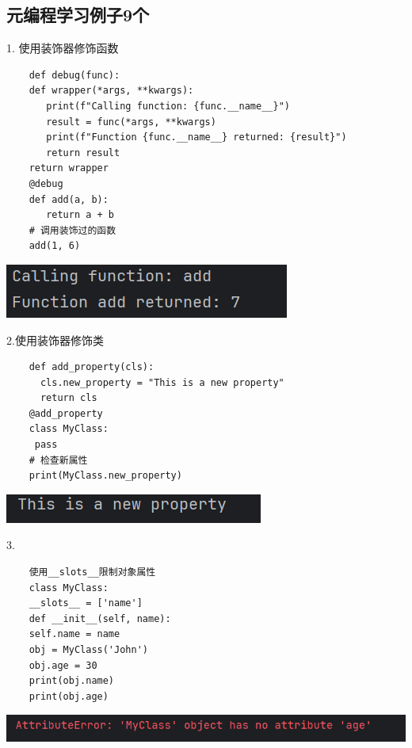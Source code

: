 \documentclass{article}
\begin{document}
\subsection{元编程学习例子9个}

1. 使用装饰器修饰函数
\begin{verbatim}
    def debug(func):
    def wrapper(*args, **kwargs):
       print(f"Calling function: {func.__name__}")
       result = func(*args, **kwargs)
       print(f"Function {func.__name__} returned: {result}")
       return result
    return wrapper
    @debug
    def add(a, b):
       return a + b
    # 调用装饰过的函数
    add(1, 6)
\end{verbatim}

\begin{minipage}{\linewidth}
    \centering
     \includegraphics[width=0.5\linewidth]{add.png}
     \label{fig:example}
\end{minipage}


2.使用装饰器修饰类
\begin{verbatim}
    def add_property(cls):
      cls.new_property = "This is a new property"
      return cls
    @add_property
    class MyClass:
     pass
    # 检查新属性
    print(MyClass.new_property)
\end{verbatim}


\noindent
\begin{minipage}{\linewidth}
 \centering
  \includegraphics[width=0.5\linewidth]{t2.png}
  \label{fig:example}
\end{minipage}

3.
\begin{verbatim}
	使用__slots__限制对象属性
	class MyClass:
	__slots__ = ['name']
	def __init__(self, name):
	self.name = name
	obj = MyClass('John')
	obj.age = 30  
	print(obj.name)
	print(obj.age)
\end{verbatim}

\noindent
\begin{minipage}{\linewidth}
	\centering
	\includegraphics[width=0.5\linewidth]{t3.png}
	\label{fig:example}
\end{minipage}
\end{document}
